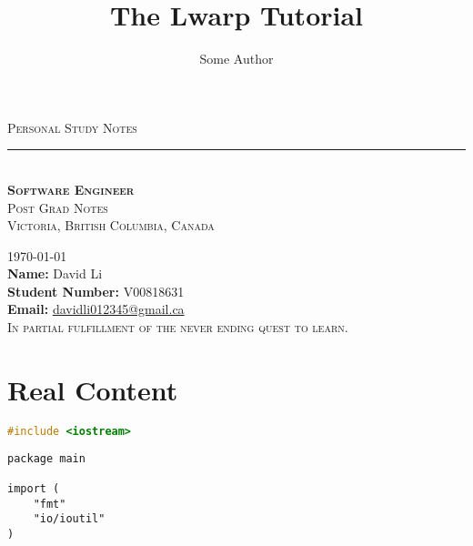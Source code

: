 \documentclass{book}
\title{The Lwarp Tutorial}
\author{Some Author}
\begin{document}
\begin{warpHTML}
	\maketitle                   %
\end{warpHTML}
\begin{center}
	{\Huge \textsc{Personal Study Notes} \\ \vspace{40pt}}
	\rule[13pt]{1\textwidth}{1pt} \\ \vspace{1pt}
	{\LARGE \textbf{{\textsc{Software Engineer}}} \\ }
	{\Large \textsc{Post Grad Notes} \\} 
	\vspace{4pt} 
	\vspace{20pt}
	{\Large \textsc{Victoria, British Columbia, Canada} \\ \vspace{45pt} }
	
	{\Large \textsc{\today} \\ \vspace{15pt}
		\textbf{Name:} \hfill David Li \\
		\textbf{Student Number:} \hfill V00818631 \\
		\textbf{Email:} \hfill \href{mailto:davidli012345@gmail.ca}{davidli012345@gmail.ca} \\
		\vspace{15pt}
		{\Large \textsc{In partial fulfillment of the never ending quest to learn. \\
			}
		}	
	}
\end{center}


\tableofcontents                %
\listoffigures
\lstlistoflistings %



\chapter{Real Content}

\begin{lstlisting}[language=C++, caption={Cpp Testing}]
#include <iostream>
\end{lstlisting}

\begin{lstlisting}[caption={Golang Program}]
package main

import (
	"fmt"
	"io/ioutil"
)
\end{lstlisting}


\end{document}
